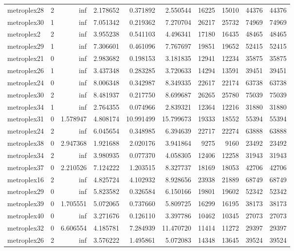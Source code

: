 \begin{longtable}{|l|r|r|r|r|r|r|r|r|r|}
metroplex28 & 2 & inf & 2.178652 & 0.371892 & 2.550544 & 16225 & 15010 & 44376 & 44376 \\
metroplex30 & 1 & inf & 7.051342 & 0.219362 & 7.270704 & 26217 & 25732 & 74969 & 74969 \\
metroplex2 & 2 & inf & 3.955238 & 0.541103 & 4.496341 & 17180 & 16435 & 48465 & 48465 \\
metroplex29 & 1 & inf & 7.306601 & 0.461096 & 7.767697 & 19851 & 19652 & 52415 & 52415 \\
metroplex21 & 0 & inf & 2.983682 & 0.198153 & 3.181835 & 12941 & 12234 & 35875 & 35875 \\
metroplex26 & 1 & inf & 3.437348 & 0.283285 & 3.720633 & 14294 & 13591 & 39451 & 39451 \\
metroplex24 & 0 & inf & 8.006348 & 0.342987 & 8.349335 & 22617 & 22174 & 63738 & 63738 \\
metroplex30 & 2 & inf & 8.481937 & 0.217750 & 8.699687 & 26265 & 25780 & 75039 & 75039 \\
metroplex34 & 1 & inf & 2.764355 & 0.074966 & 2.839321 & 12364 & 12216 & 31880 & 31880 \\
metroplex31 & 0 & 1.578947 & 4.808174 & 10.991499 & 15.799673 & 19333 & 18552 & 55394 & 55394 \\
metroplex24 & 2 & inf & 6.045654 & 0.348985 & 6.394639 & 22717 & 22274 & 63888 & 63888 \\
metroplex38 & 0 & 2.947368 & 1.921688 & 2.020176 & 3.941864 & 9275 & 9160 & 23492 & 23492 \\
metroplex34 & 2 & inf & 3.980935 & 0.077370 & 4.058305 & 12406 & 12258 & 31943 & 31943 \\
metroplex37 & 0 & 2.210526 & 7.124222 & 1.203515 & 8.327737 & 18169 & 18053 & 42706 & 42706 \\
metroplex16 & 2 & inf & 4.825724 & 4.102932 & 8.928656 & 23938 & 21889 & 68749 & 68749 \\
metroplex29 & 0 & inf & 5.823582 & 0.326584 & 6.150166 & 19801 & 19602 & 52342 & 52342 \\
metroplex39 & 0 & 1.705551 & 5.072065 & 0.737660 & 5.809725 & 16299 & 16195 & 38173 & 38173 \\
metroplex40 & 0 & inf & 3.271676 & 0.126110 & 3.397786 & 10462 & 10345 & 27073 & 27073 \\
metroplex32 & 0 & 6.606554 & 4.185781 & 7.284939 & 11.470720 & 11414 & 11272 & 29397 & 29397 \\
metroplex26 & 2 & inf & 3.576222 & 1.495861 & 5.072083 & 14348 & 13645 & 39524 & 39524 \\

\end{longtable}
